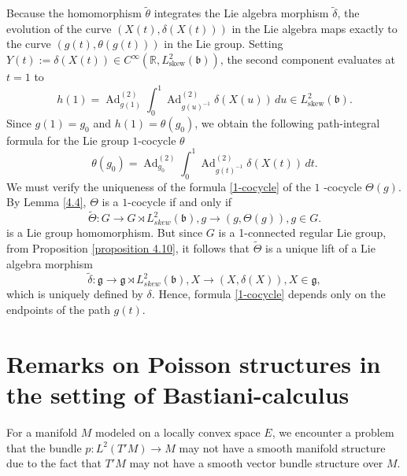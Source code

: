 \documentclass[11pt,reqno]{amsart}
\theoremstyle{definition}
\numberwithin{equation}{section}
\begin{document}
Because the homomorphism $\tilde{\theta}$ integrates the Lie algebra morphism $\tilde{\delta}$, the evolution of the curve $(X(t), \delta(X(t)))$ in the Lie algebra maps exactly to the curve $(g(t), \theta(g(t)))$ in the Lie group. Setting $Y(t) := \delta(X(t)) \in C^\infty(\mathbb{R}, L^2_{\text{skew}}(\mathfrak{b}))$, the second component evaluates at $t=1$ to
\[
h(1) = \operatorname{Ad}^{(2)}_{g(1)} \int_{0}^{1} \operatorname{Ad}^{(2)}_{g(u)^{-1}} \delta(X(u)) \, du \in L^2_{\text{skew}}(\mathfrak{b}).
\]
Since $g(1) = g_0$ and $h(1) = \theta(g_0)$, we obtain the following path-integral formula for the Lie group $1$-cocycle $\theta$
\begin{equation}\label{1-cocycle}
    \theta(g_0) = \operatorname{Ad}^{(2)}_{g_0} \int_{0}^{1} \operatorname{Ad}^{(2)}_{g(t)^{-1}} \delta(X(t)) \, dt.
\end{equation}
We must verify the uniqueness of the formula \ref{1-cocycle} of the $1$ -cocycle $\Theta(g)$. By Lemma \ref{4.4}, $\Theta$ is a $1$-cocycle if and only if \[\tilde \Theta : G \to G\rtimes L^2_{skew}(\mathfrak b), g\to(g, \Theta(g)), g\in G. \] is a Lie group homomorphism. But since $G$ is a 1-connected regular Lie group, from Proposition \ref{proposition 4.10}, it follows that $\tilde \Theta $ is a unique lift of a Lie algebra morphism \[\tilde \delta : \mathfrak g \to \mathfrak g\rtimes L^2_{skew}(\mathfrak b), X\to (X,\delta(X)), X\in \mathfrak g,\] which is uniquely defined by $\delta$. Hence, formula \ref{1-cocycle} depends only on the endpoints of the path $g(t)$.


\section{Remarks on Poisson structures in the setting of Bastiani-calculus}\label{7}
For a manifold $M$ modeled on a locally convex space $E$, we encounter a problem that the bundle $p: L^2(T'M)\to M$ may not have a smooth manifold structure due to the fact that $T'M$ may not have a smooth vector bundle structure over $M$.
\end{document}
